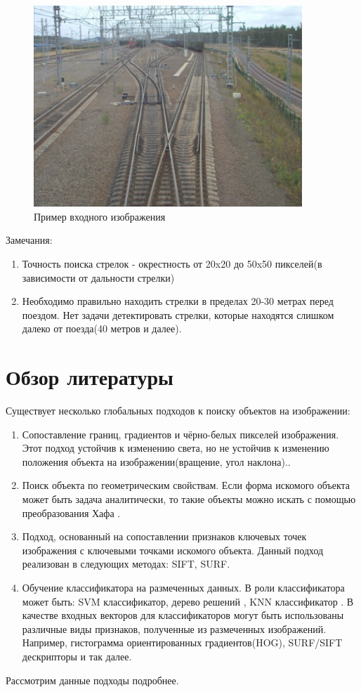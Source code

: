 \begin{figure}[!h]
	\centering
	\includegraphics[width=0.9\textwidth]{pictures/img0002.jpg} 
	\caption{Пример входного изображения}
	\label{fig:input}
\end{figure}

\newpage
Замечания: 
\begin{enumerate}
	\item Точность поиска стрелок - окрестность от 20x20 до 50x50 пикселей(в зависимости от дальности стрелки)
	\item Необходимо правильно находить стрелки в пределах 20-30 метрах перед поездом. Нет задачи детектировать стрелки, которые находятся слишком далеко от поезда(40 метров и далее).
\end{enumerate}

\section{Обзор литературы}
\label{obzor}
Существует несколько глобальных подходов к поиску объектов на изображении:
\begin{enumerate}
	\item Сопоставление границ, градиентов и чёрно-белых пикселей изображения. Этот подход устойчив к изменению света, но не устойчив к изменению положения объекта на изображении(вращение, угол наклона).\cite{b:edge_match}.
	\item Поиск объекта по геометрическим свойствам. Если форма искомого объекта может быть задача аналитически, то такие объекты можно искать с помощью преобразования Хафа \cite{b:hough_transform}.
	\item Подход, основанный на сопоставлении признаков ключевых точек изображения с ключевыми точками искомого объекта. Данный подход реализован в следующих методах: SIFT\cite{b:SIFT}, SURF\cite{b:SURF}.
	\item Обучение классификатора на размеченных данных. В роли классификатора может быть: SVM классификатор\cite{b:SVM}, дерево решений \cite{b:decision_tree}, KNN классификатор \cite{b:knn}. В качестве входных векторов для классификаторов могут быть использованы различные виды признаков, полученные из размеченных изображений. 
	Например, гистограмма ориентированных градиентов(HOG)\cite{b:HOG},
	SURF\cite{b:SIFT}/SIFT\cite{b:SURF} дескрипторы и так далее. 
\end{enumerate}
Рассмотрим данные подходы подробнее.
